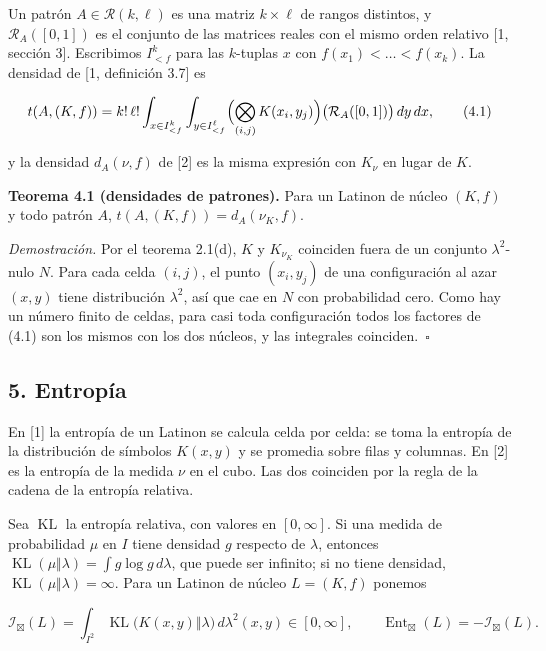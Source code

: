 \documentclass[spanish,11pt,a4paper]{article}
\begin{document}
Un patrón \(A\in\mathcal R(k,\ell)\) es una matriz \(k\times\ell\) de rangos distintos, y \(\mathcal R_A([0,1])\) es el conjunto de las matrices reales con el mismo orden relativo {[}1, sección 3{]}. Escribimos \(I^k_{<f}\) para las \(k\)-tuplas \(x\) con \(f(x_1)<\dots<f(x_k)\). La densidad de {[}1, definición 3.7{]} es

\nopagebreak[4]
\[t(A,(K,f))=k!\,\ell!\int_{x\in I^k_{<f}}\int_{y\in I^\ell_{<f}}\Bigl(\bigotimes_{(i,j)}K(x_i,y_j)\Bigr)\bigl(\mathcal R_A([0,1])\bigr)\,dy\,dx,\tag{4.1}\]

y la densidad \(d_A(\nu,f)\) de {[}2{]} es la misma expresión con \(K_\nu\) en lugar de \(K\).

\textbf{Teorema 4.1 (densidades de patrones).} Para un Latinon de núcleo \((K,f)\) y todo patrón \(A\), \(t(A,(K,f))=d_A(\nu_K,f)\).

\emph{Demostración.} Por el teorema 2.1(d), \(K\) y \(K_{\nu_K}\) coinciden fuera de un conjunto \(\lambda^2\)-nulo \(N\). Para cada celda \((i,j)\), el punto \((x_i,y_j)\) de una configuración al azar \((x,y)\) tiene distribución \(\lambda^2\), así que cae en \(N\) con probabilidad cero. Como hay un número finito de celdas, para casi toda configuración todos los factores de (4.1) son los mismos con los dos núcleos, y las integrales coinciden.~\(\square\)

\subsection{5. Entropía}\label{entropuxeda}

En {[}1{]} la entropía de un Latinon se calcula celda por celda: se toma la entropía de la distribución de símbolos \(K(x,y)\) y se promedia sobre filas y columnas. En {[}2{]} es la entropía de la medida \(\nu\) en el cubo. Las dos coinciden por la regla de la cadena de la entropía relativa.

Sea \(\operatorname{KL}\) la entropía relativa, con valores en \([0,\infty]\). Si una medida de probabilidad \(\mu\) en \(I\) tiene densidad \(g\) respecto de \(\lambda\), entonces \(\operatorname{KL}(\mu\Vert\lambda)=\int g\log g\,d\lambda\), que puede ser infinito; si no tiene densidad, \(\operatorname{KL}(\mu\Vert\lambda)=\infty\). Para un Latinon de núcleo \(L=(K,f)\) ponemos

\nopagebreak[4]
\[\mathcal I_{\boxtimes}(L)=\int_{I^2}\operatorname{KL}\bigl(K(x,y)\Vert\lambda\bigr)\,d\lambda^2(x,y)\in[0,\infty],\qquad
\operatorname{Ent}_{\boxtimes}(L)=-\mathcal I_{\boxtimes}(L).\tag{5.1}\]
\end{document}
